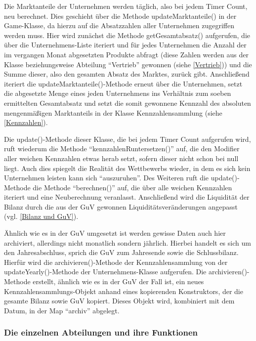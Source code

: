 Die Marktanteile der Unternehmen werden täglich, also bei jedem Timer Count, neu berechnet. Dies geschieht über die Methode updateMarktanteile() in der Game-Klasse, da hierzu auf die Absatzzahlen aller Unternehmen zugegriffen werden muss. Hier wird zunächst die Methode getGesamtabsatz() aufgerufen, die über die Unternehmens-Liste iteriert und für jedes Unternehmen die Anzahl der im vergangen Monat abgesetzten Produkte abfragt (diese Zahlen werden aus der Klasse beziehungsweise Abteilung \enquote{Vertrieb} gewonnen (siehe \ref{Vertrieb})) und die Summe dieser, also den gesamten Absatz des Marktes, zurück gibt. Anschließend iteriert die updateMarktanteile()-Methode erneut über die Unternehmen, setzt die abgesetzte Menge eines jeden Unternehmens ins Verhältnis zum soeben ermittelten Gesamtabsatz und setzt die somit gewonnene Kennzahl des absoluten mengenmäßigen Marktanteils in der Klasse Kennzahlensammlung (siehe \ref{Kennzahlen}).

Die update()-Methode dieser Klasse, die bei jedem Timer Count aufgerufen wird, ruft wiederum die Methode \enquote{kennzahlenRuntersetzen()} auf, die den Modifier aller weichen Kennzahlen etwas herab setzt, sofern dieser nicht schon bei null liegt. Auch dies spiegelt die Realität des Wettbewerbs wieder, in dem es sich kein Unternehmen leisten kann sich \enquote{auszuruhen}. Des Weiteren ruft die update()-Methode die Methode \enquote{berechnen()} auf, die über alle weichen Kennzahlen iteriert und eine Neuberechnung veranlasst. Anschließend wird die Liquidität der Bilanz durch die aus der GuV gewonnen Liquiditätsveränderungen angepasst (vgl. \ref{Bilanz und GuV}).

Ähnlich wie es in der GuV umgesetzt ist werden gewisse Daten auch hier archiviert, allerdings nicht monatlich sondern jährlich. Hierbei handelt es sich um den Jahresabschluss, sprich die GuV zum Jahresende sowie die Schlussbilanz. Hierfür wird die archivieren()-Methode der Kennzahlensammlung von der updateYearly()-Methode der Unternehmens-Klasse aufgerufen. Die archivieren()-Methode erstellt, ähnlich wie es in der GuV der Fall ist, ein neues Kennzahlensammlungs-Objekt anhand eines kopierenden Konstruktors, der die gesamte Bilanz sowie GuV kopiert. Dieses Objekt wird, kombiniert mit dem Datum, in der Map \enquote{archiv} abgelegt.

\subsubsection{Die einzelnen Abteilungen und ihre Funktionen}
\label{Abteilungen}

